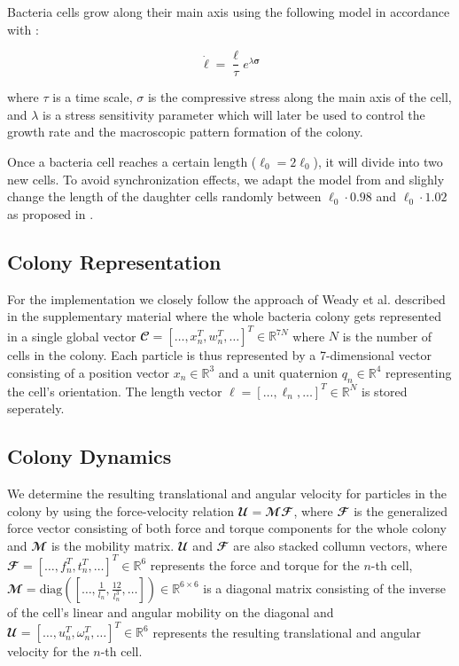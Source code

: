 \documentclass[conference]{IEEEtran}
\begin{document}
Bacteria cells grow along their main axis using the following model in accordance with \cite{Weady2024}:

\begin{equation}
    \dot{{\ell}} =  \frac{{\ell}}{\tau} e^{\lambda \boldsymbol{\sigma}}
\end{equation}


where $\tau$ is a time scale, $\sigma$ is the compressive stress along the main axis of the cell, and $\lambda$ is a stress sensitivity parameter which will later be used to control the growth rate and the macroscopic pattern formation of the colony.

Once a bacteria cell reaches a certain length ($\ell_0 = 2\ell_0$), it will divide into two new cells. To avoid synchronization effects, we adapt the model from \cite{Weady2024} and slighly change the length of the daughter cells randomly between $\ell_0 \cdot 0.98$ and $\ell_0 \cdot 1.02$ as proposed in \cite{Khan_2024}.

\newpage
\subsection{Colony Representation}

For the implementation we closely follow the approach of Weady et al. \cite{Weady2024} described in the supplementary material where the whole bacteria colony gets represented in a single global vector $\mathbfcal{C} = [\dots, x_n^T, w_n^T, \dots]^T \in \mathbb{R}^{7N}$ where $N$ is the number of cells in the colony. Each particle is thus represented by a 7-dimensional vector consisting of a position vector $x_n \in \mathbb{R}^3$ and a unit quaternion $q_n \in \mathbb{R}^4$ representing the cell's orientation. The length vector $\boldsymbol{\ell} = [\dots, \ell_n, \dots]^T \in \mathbb{R}^{N}$ is stored seperately.

\subsection{Colony Dynamics}

We determine the resulting translational and angular velocity for particles in the colony by using the force-velocity relation $\mathbfcal{U} = \mathbfcal{M} \mathbfcal{F}$, where $\mathbfcal{F}$ is the generalized force vector consisting of both force and torque components for the whole colony and $\mathbfcal{M}$ is the mobility matrix. $\mathbfcal{U}$ and $\mathbfcal{F}$ are also stacked collumn vectors, where $\mathbfcal{F} = [\dots, f_n^T, t_n^T, \dots]^T \in \mathbb{R}^{6}$ represents the force and torque for the $n$-th cell, $\mathbfcal{M} = \text{diag}([\dots, \frac{1}{l_n}, \frac{12}{l_n^3}, \dots]) \in \mathbb{R}^{6 \times 6}$ is a diagonal matrix consisting of the inverse of the cell's linear and angular mobility on the diagonal and $\mathbfcal{U} = [\dots, u_n^T, \omega_n^T, \dots]^T \in \mathbb{R}^{6}$ represents the resulting translational and angular velocity for the $n$-th cell.
\end{document}
